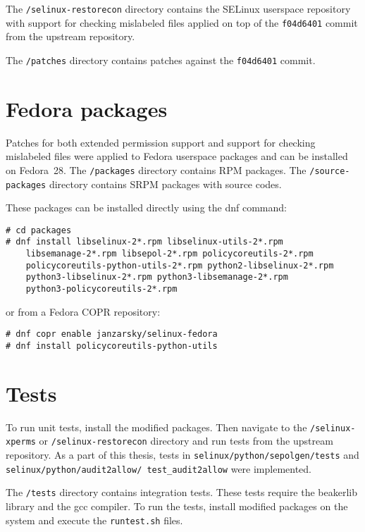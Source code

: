 The \texttt{/selinux-restorecon} directory contains the SELinux userspace
repository with support for checking mislabeled files applied on top of the
\texttt{f04d6401} commit from the upstream repository.

The \texttt{/patches} directory contains patches against the \texttt{f04d6401}
commit.

\section{Fedora packages}

Patches for both extended permission support and support for checking mislabeled
files were applied to Fedora userspace packages and can be installed on
Fedora~28. The \texttt{/packages} directory contains RPM packages. The
\texttt{/source-packages} directory contains SRPM packages with source codes.

These packages can be installed directly using the dnf command:
\begin{lstlisting}
# cd packages
# dnf install libselinux-2*.rpm libselinux-utils-2*.rpm
    libsemanage-2*.rpm libsepol-2*.rpm policycoreutils-2*.rpm
    policycoreutils-python-utils-2*.rpm python2-libselinux-2*.rpm
    python3-libselinux-2*.rpm python3-libsemanage-2*.rpm
    python3-policycoreutils-2*.rpm
\end{lstlisting}
or from a Fedora COPR repository:
\begin{lstlisting}
# dnf copr enable janzarsky/selinux-fedora
# dnf install policycoreutils-python-utils
\end{lstlisting}

\section{Tests}
To run unit tests, install the modified packages. Then navigate to the
\texttt{/selinux-xperms} or \texttt{/selinux-restorecon} directory and run tests
from the upstream repository. As a part of this thesis, tests in
\texttt{selinux/\allowbreak python/\allowbreak sepolgen/\allowbreak tests} and 
\texttt{selinux/\allowbreak python/\allowbreak audit2al\-low/\allowbreak
test\_audit2allow} were implemented.

The \texttt{/tests} directory contains integration tests. These tests require
the beakerlib library and the gcc compiler. To run the tests, install modified
packages on the system and execute the \texttt{runtest.sh} files.

